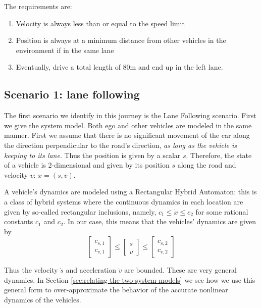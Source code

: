 The requirements are:
	\begin{enumerate}
		\item Velocity is always less than or equal to the speed limit
		\item Position is always at a minimum distance from other vehicles in the environment if in the same lane
		\item Eventually, drive a total length of 80m and end up in the left lane.
	\end{enumerate}

\subsection{Scenario 1: lane following}
The first scenario we identify in this journey is the Lane Following scenario. 
First we give the system model.
Both ego and other vehicles are modeled in the same manner. 
First we assume that there is no significant movement of the car along the direction perpendicular to the road's direction, \emph{as long as the vehicle is keeping to its lane}.
Thus the position is given by a scalar $s$.
Therefore, the state of a vehicle is 2-dimensional and given by its position $s$ along the road and velocity $v$: $x = (s,v)$.

A vehicle's dynamics are modeled using a Rectangular Hybrid Automaton: this is a class of hybrid systems where the continuous dynamics in each location are given by so-called rectangular inclusions, namely, $c_1 \leq \dot{x} \leq c_2$ for some rational constants $c_1$ and $c_2$. 
In our case, this means that the vehicles' dynamics are given by 
\[\left[\begin{matrix}
c_{s,1}\\c_{v,1}
\end{matrix}\right]
\leq
\left[\begin{matrix}
\dot{s}\\ \dot{v}
\end{matrix}\right]
\leq
\left[\begin{matrix}
c_{s,2}\\c_{v,2}
\end{matrix}\right]
\]

Thus the velocity $\dot{s}$ and acceleration $\dot{v}$ are bounded.
These are very general dynamics. 
In Section \ref{sec:relating-the-two-system-models} we see how we use this general form to over-approximate the behavior of the accurate nonlinear dynamics of the vehicles.

